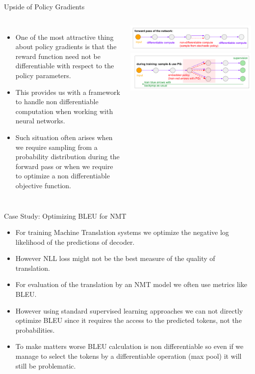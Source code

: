 \begin{frame}{Upside of Policy Gradients}
\begin{columns}
\begin{itemize}
    \item One of the most attractive thing about policy gradients is that the reward function need not be differentiable with respect to the policy parameters.
    \item This provides us with a framework to handle non differentiable computation when working with neural networks.
    \item Such situation often arises when we require sampling from a probability distribution during the forward pass or when we require to optimize a non differentiable objective function. 
\end{itemize}
\includegraphics[scale = 0.25]{img/nondiffcomput.png}
\newline
\includegraphics[scale = 0.25]{img/nondiffcomput2.png}
\end{columns}
\end{frame}
\begin{frame}{Case Study: Optimizing BLEU for NMT}
    \begin{itemize}
        \item For training Machine Translation systems we optimize the negative log likelihood of the predictions of decoder.
        \item However NLL loss might not be the best measure of the quality of translation.
        \item For evaluation of the translation by an NMT model we often use metrics like BLEU.
        \item However using standard supervised learning approaches we can not directly optimize BLEU since it requires the access to the predicted tokens, not the probabilities.
        \item To make matters worse BLEU calculation is non differentiable so even if we manage to select the tokens by a differentiable operation (max pool) it will still be problematic.
    \end{itemize}
\end{frame}
